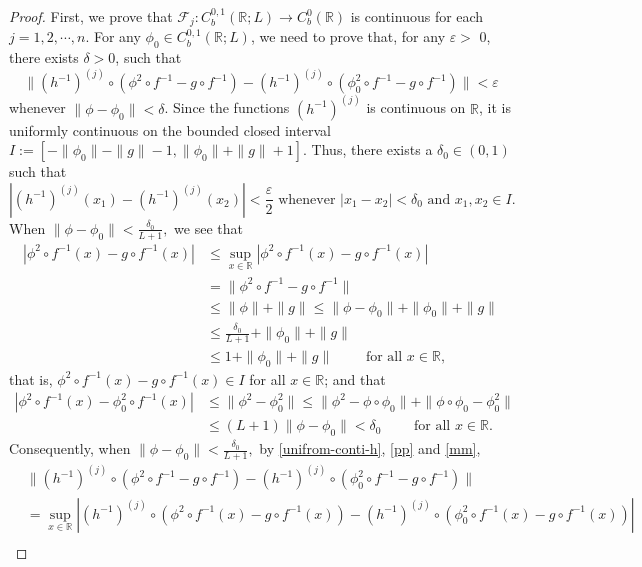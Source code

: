 \documentclass[11pt,reqno,a4paper]{amsart}
\numberwithin{equation}{section}
\renewcommand{\epsilon}{\varepsilon}
\begin{document}
\begin{proof}
 First, we prove that $\mathcal{F}_j: C^{0,1}_b(\mathbb{R};L) \to C^0_b(\mathbb{R})$ is continuous for each $j=1,2,\cdots,n$. For any $\phi_0 \in C_{b}^{0,1}(\mathbb{R};L)$, we need to prove that, for any $\epsilon >$ 0, there exists $\delta >0$, such that 
  $$\|(h^{-1})^{(j)} \circ (\phi^{2} \circ f^{-1}-g \circ f^{-1})-(h^{-1})^{(j)} \circ (\phi_0^{2} \circ f^{-1}-g \circ f^{-1})\|<\epsilon$$ whenever $\|\phi-\phi_0\| < \delta$.
  Since the functions $(h^{-1})^{(j)}$ is continuous on $\mathbb{R}$, it is uniformly continuous on the bounded closed interval $I:= [-\|\phi_0\|-\|g\|-1,\|\phi_0\|+\|g\|+1]$. Thus, there exists a $\delta_0  \in (0,1)$ such that
  \begin{equation}\label{unifrom-conti-h}
   |(h^{-1})^{(j)}(x_1)-(h^{-1})^{(j)}(x_2)|< \frac{\epsilon}{2} \text{ whenever } |x_1-x_2|< \delta_0 \text{ and } x_1,x_2 \in I.   
  \end{equation}
  When $\|\phi-\phi_0\| < \frac{\delta_0}{L+1},$ we see that
  \begin{align}\label{pp}
|\phi^{2} \circ f^{-1}(x)-g \circ f^{-1}(x)| &\le \sup_{x \in \mathbb{R}}|\phi^{2} \circ f^{-1}(x)-g \circ f^{-1}(x)|\nonumber
\\
&=
\|\phi^{2} \circ f^{-1}-g \circ f^{-1}\| \nonumber\\
&\le \|\phi\| +\|g\| \le \|\phi-\phi_0\| +\|\phi_0\|+\|g\|
\nonumber\\
& \le \frac{\delta_0}{L+1} +\| \phi_0 \|+\|g\|
\nonumber\\
&\le 1+\| \phi_0 \|+\|g\| \qquad  \text{ for all } x \in \mathbb{R},
  \end{align}
that is, $ \phi^{2} \circ f^{-1}(x)-g \circ f^{-1}(x) \in I$ for all $ x \in \mathbb{R}$; and that
   \begin{align}\label{mm}
  |\phi^{2} \circ f^{-1}(x)- \phi_0^{2} \circ f^{-1}(x)| &\le \|\phi^{2}-\phi_0^{2}\| \le \|\phi^{2}-\phi \circ \phi_0\| +\|\phi \circ \phi_0-\phi_0^{2}\| \nonumber\\ &\le (L+1)\|\phi-\phi_0\| < \delta_0 \qquad  \text{ for all } x \in \mathbb{R}.
  \end{align}
  Consequently,  when $\|\phi-\phi_0\| < \frac{\delta_0}{L+1},$ by \eqref{unifrom-conti-h}, \eqref{pp} and \eqref{mm}, 
  \begin{align*}
  &\|(h^{-1})^{(j)}\circ (\phi^{2} \circ f^{-1}-g \circ f^{-1})-(h^{-1})^{(j)}\circ (\phi_0^{2}\circ f^{-1}-g \circ f^{-1})\| \\
  &= \sup_{x \in \mathbb{R}}|(h^{-1})^{(j)}\circ (\phi^{2} \circ f^{-1}(x)-g \circ f^{-1}(x))-(h^{-1})^{(j)}\circ (\phi_0^{2} \circ f^{-1}(x)-g \circ f^{-1}(x))|\\

\end{align*}
\end{proof}
\end{document}

